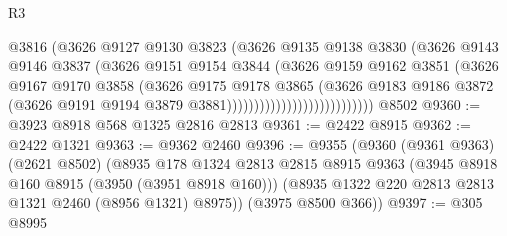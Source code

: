 \begin{lexlean}{R3}
\begin{coremodule}
                                        @3816
                                        (@3626
                                          @9127
                                          @9130
                                          @3823
                                          (@3626
                                            @9135
                                            @9138
                                            @3830
                                            (@3626
                                              @9143
                                              @9146
                                              @3837
                                              (@3626
                                                @9151
                                                @9154
                                                @3844
                                                (@3626
                                                  @9159
                                                  @9162
                                                  @3851
                                                  (@3626
                                                    @9167
                                                    @9170
                                                    @3858
                                                    (@3626
                                                      @9175
                                                      @9178
                                                      @3865
                                                      (@3626
                                                        @9183
                                                        @9186
                                                        @3872
                                                        (@3626
                                                          @9191
                                                          @9194
                                                          @3879
                                                          @3881)))))))))))))))))))))))))))
    @8502
@9360 := @3923 @8918 @568 @1325 @2816 @2813
@9361 := @2422 @8915
@9362 := @2422 @1321
@9363 := @9362 @2460
@9396 := @9355
    (@9360
      (@9361 @9363)
      (@2621 @8502)
      (@8935
        @178
        @1324
        @2813
        @2815
        @8915
        @9363
        (@3945 @8918 @160 @8915 (@3950 (@3951 @8918 @160)))
        (@8935 @1322 @220 @2813 @2813 @1321 @2460 (@8956 @1321) @8975))
      (@3975 @8500 @366))
@9397 := @305 @8995

\end{coremodule}
\end{lexlean}
